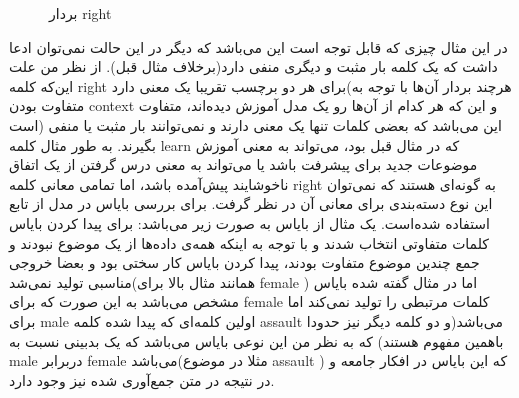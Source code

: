 \documentclass[a4paper]{article}
\begin{document}
\begin{figure}[h!]
\caption{بردار right}
\label{f1}
\end{figure}
\vspace{10mm}
\newline
در این مثال چیزی که قابل توجه است این‌ می‌باشد که دیگر در این حالت نمی‌توان ادعا داشت که یک کلمه بار مثبت و دیگری منفی دارد(برخلاف مثال قبل). از نظر من علت این‌که کلمه right برای هر دو برچسب تقریبا یک معنی دارد(هرچند بردار آن‌ها با توجه به متفاوت بودن context و این که هر کدام از آن‌ها رو یک مدل آموزش دیده‌اند، متفاوت است) این می‌باشد که بعضی کلمات تنها یک معنی دارند و نمی‌توانند بار مثبت یا منفی بگیرند. به طور مثال کلمه learn که در مثال قبل بود، می‌تواند به معنی آموزش موضوعات جدید برای پیشرفت باشد یا می‌تواند به معنی درس گرفتن از یک اتفاق ناخوشایند پیش‌آمده باشد، اما تمامی معانی کلمه right به گونه‌ای هستند که نمی‌توان این نوع دسته‌بندی برای معانی آن در نظر گرفت.
\newline
برای بررسی بایاس در مدل از تابع  استفاده شده‌است. یک مثال از بایاس به صورت زیر می‌باشد:
\newline
\newline
{}
\newline
برای پیدا کردن بایاس کلمات متفاوتی انتخاب شدند و با توجه به اینکه همه‌ی داده‌ها از یک موضوع نبودند و جمع چندین موضوع متفاوت بودند، پیدا کردن بایاس کار سختی بود و بعضا خروجی مناسبی تولید نمی‌شد(همانند مثال بالا برای female ) اما در مثال گفته شده بایاس مشخص می‌باشد به این صورت که برای female کلمات مرتبطی را تولید نمی‌کند اما برای male اولین کلمه‌ای که پیدا شده کلمه assault می‌باشد(و دو کلمه دیگر نیز حدودا باهمین مفهوم هستند) که به نظر من این نوعی بایاس می‌باشد که یک بدبینی نسبت به male دربرابر female می‌باشد(مثلا در موضوع assault ) که این بایاس در افکار جامعه و در نتیجه در متن جمع‌‌آوری شده نیز وجود دارد.
\newline
\end{document}
